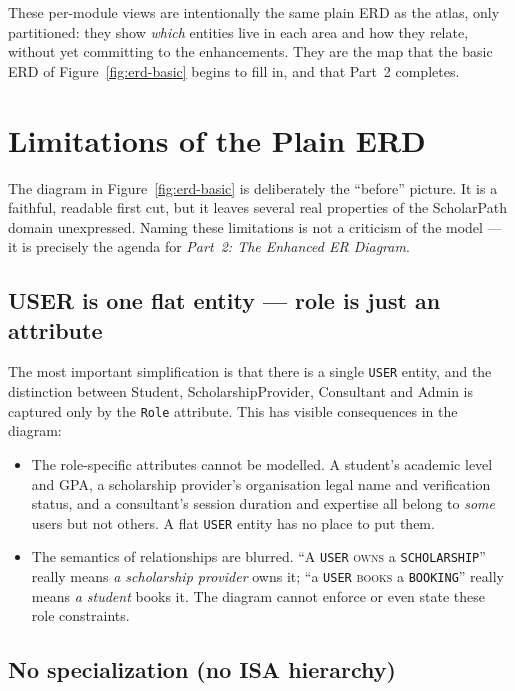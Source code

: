 \documentclass[11pt,a4paper]{article}
\begin{document}
These per-module views are intentionally the same plain ERD as the atlas, only
partitioned: they show \emph{which} entities live in each area and how they
relate, without yet committing to the enhancements. They are the map that the
basic ERD of Figure~\ref{fig:erd-basic} begins to fill in, and that Part~2
completes.

\section{Limitations of the Plain ERD}

The diagram in Figure~\ref{fig:erd-basic} is deliberately the ``before''
picture. It is a faithful, readable first cut, but it leaves several real
properties of the ScholarPath domain unexpressed. Naming these limitations is
not a criticism of the model --- it is precisely the agenda for
\emph{Part~2: The Enhanced ER Diagram}.

\subsection{USER is one flat entity --- role is just an attribute}

The most important simplification is that there is a single \texttt{USER}
entity, and the distinction between Student, ScholarshipProvider, Consultant and Admin is
captured only by the \texttt{Role} attribute. This has visible consequences in
the diagram:

\begin{itemize}[leftmargin=1.4em]
  \item The role-specific attributes cannot be modelled. A student's academic
        level and GPA, a scholarship provider's organisation legal name and
        verification status, and a consultant's session duration and expertise
        all belong to \emph{some} users but not others. A flat \texttt{USER}
        entity has no place to put them.
  \item The semantics of relationships are blurred. ``A \texttt{USER}
        \textsc{owns} a \texttt{SCHOLARSHIP}'' really means \emph{a scholarship
        provider} owns it; ``a \texttt{USER} \textsc{books} a \texttt{BOOKING}''
        really
        means \emph{a student} books it. The diagram cannot enforce or even
        state these role constraints.
\end{itemize}

\subsection{No specialization (no ISA hierarchy)}
\end{document}
